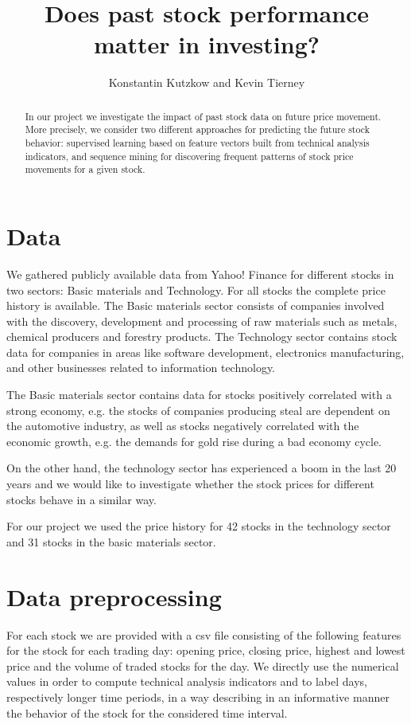 \documentclass{llncs}
\begin{document}
\title{Does past stock performance matter in investing?}
\date{}
\author{Konstantin Kutzkow and Kevin Tierney}
\institute{}
\maketitle
\begin{abstract}
In our project we investigate the impact of past stock data on future price movement. More precisely, we consider two different approaches for predicting the future stock behavior: supervised learning based on feature vectors built from technical analysis indicators, and  sequence mining for discovering frequent patterns of stock price movements for a given stock. %
\end{abstract}
\section*{Data}
We gathered publicly available data from Yahoo! Finance for different stocks in two sectors: Basic materials and Technology. For all stocks the complete price history is available. The Basic materials sector consists of companies involved with the discovery, development and processing of raw materials such as metals, chemical producers and forestry products. The Technology sector contains stock data for companies in areas like software development, electronics manufacturing, and other businesses related to information technology.

The Basic materials sector contains data for stocks positively correlated with a strong economy, e.g. the stocks of companies producing steal are dependent on the automotive industry, as well as stocks negatively correlated with the economic growth, e.g. the demands for gold rise during a bad economy cycle.

On the other hand, the technology sector has experienced a boom in the last 20 years and we would like to investigate whether the stock prices for different stocks behave in a similar way. 

For our project we used the price history for 42 stocks in the technology sector and 31 stocks in the basic materials sector. 
\section*{Data preprocessing}
For each stock we are provided with a csv file consisting of the following features for the stock for each trading day: opening price, closing price, highest and lowest price and the volume of traded stocks for the day. We directly use the numerical values in order to compute technical analysis indicators and to label days, respectively longer time periods, in a way describing in an informative manner the behavior of the stock for the considered time interval. 
\end{document}
